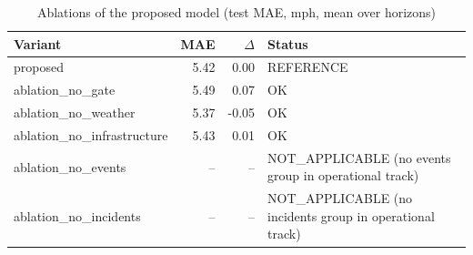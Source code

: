 \begin{table}[t]\centering\caption{Ablations of the proposed model (test MAE, mph, mean over horizons)}\label{tab:ablation}
\begin{tabular}{lrrl}\toprule Variant & MAE & $\Delta$ & Status \\ \midrule
proposed & 5.42 & 0.00 & REFERENCE \\
ablation\_no\_gate & 5.49 & 0.07 & OK \\
ablation\_no\_weather & 5.37 & -0.05 & OK \\
ablation\_no\_infrastructure & 5.43 & 0.01 & OK \\
ablation\_no\_events & -- & -- & NOT\_APPLICABLE (no events group in operational track) \\
ablation\_no\_incidents & -- & -- & NOT\_APPLICABLE (no incidents group in operational track) \\
\bottomrule\end{tabular}\end{table}
